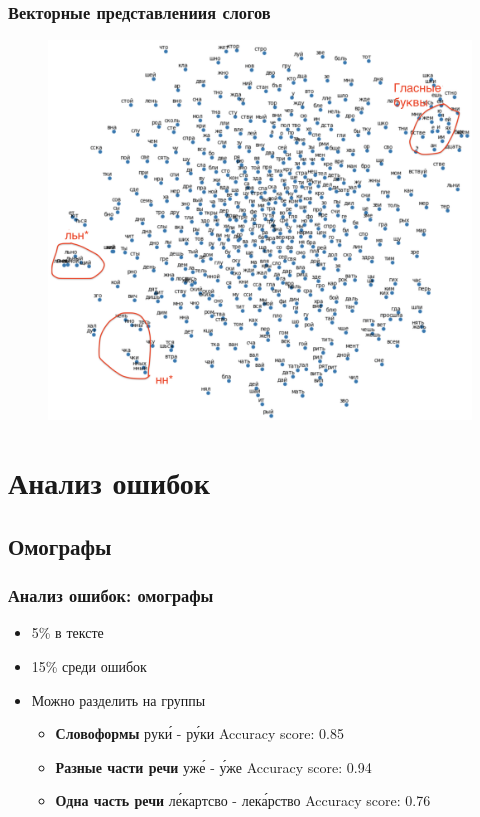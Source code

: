 \documentclass[russian]{beamer}
\begin{document}
\begin{frame} 
\frametitle{Векторные представлениия слогов}
\begin{figure}[H]
	\begin{center}
		\includegraphics[width=0.8\linewidth]{Emb}
	\end{center}
\end{figure}

\end{frame}



\section{Анализ ошибок}
\subsection{Омографы}
\begin{frame}
\frametitle{Анализ ошибок: омографы}
\begin{itemize}
	\item 5\% в тексте
	\item 15\% среди ошибок
	\item Можно разделить на группы
	\begin{itemize}
		\item \textbf{Словоформы} \newline  рук\'{и} - р\'{у}ки \newline Accuracy score: 0.85
		\item \textbf{Разные части речи} \newline уж\'{е} - \'{у}же \newline Accuracy score: 0.94
		\item \textbf{Одна часть речи} \newline л\'{е}картсво - лек\'{а}рство \newline Accuracy score: 0.76	
\end{itemize}
	
\end{itemize}

\end{frame}
\end{document}
